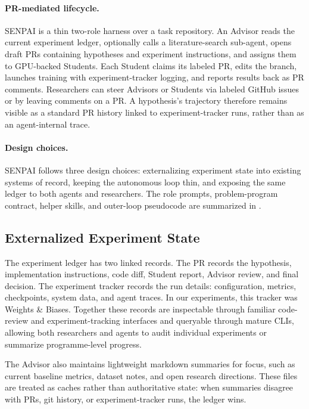 \documentclass{article}
\begin{document}
\paragraph{PR-mediated lifecycle.}
SENPAI is a thin two-role harness over a task repository. An Advisor reads the current experiment ledger, optionally calls a literature-search sub-agent, opens draft PRs containing hypotheses and experiment instructions, and assigns them to GPU-backed Students. Each Student claims its labeled PR, edits the branch, launches training with experiment-tracker logging, and reports results back as PR comments. Researchers can steer Advisors or Students via labeled GitHub issues or by leaving comments on a PR. A hypothesis's trajectory therefore remains visible as a standard PR history linked to experiment-tracker runs, rather than as an agent-internal trace.

\paragraph{Design choices.}
SENPAI follows three design choices: externalizing experiment state into existing systems of record, keeping the autonomous loop thin, and exposing the same ledger to both agents and researchers. The role prompts, problem-program contract, helper skills, and outer-loop pseudocode are summarized in .

\subsection{Externalized Experiment State}

The experiment ledger has two linked records. The PR records the hypothesis, implementation instructions, code diff, Student report, Advisor review, and final decision. The experiment tracker records the run details: configuration, metrics, checkpoints, system data, and agent traces. In our experiments, this tracker was Weights \& Biases. Together these records are inspectable through familiar code-review and experiment-tracking interfaces and queryable through mature CLIs, allowing both researchers and agents to audit individual experiments or summarize programme-level progress.

The Advisor also maintains lightweight markdown summaries for focus, such as current baseline metrics, dataset notes, and open research directions. These files are treated as caches rather than authoritative state: when summaries disagree with PRs, git history, or experiment-tracker runs, the ledger wins.
\end{document}
